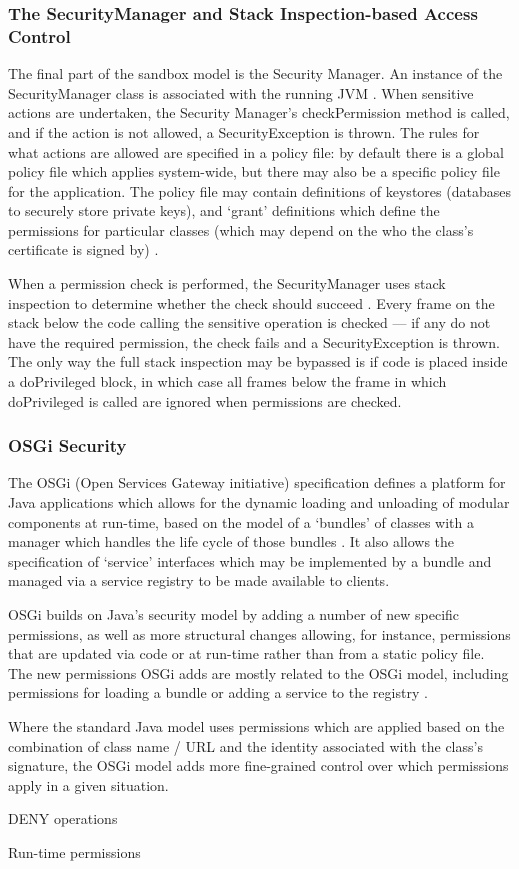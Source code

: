 \subsubsection{The SecurityManager and Stack Inspection-based Access Control}

The final part of the sandbox model is the Security Manager. An instance of the SecurityManager class is associated with the running JVM \cite{gosling2014java}. When sensitive actions are undertaken, the Security Manager's checkPermission method is called, and if the action is not allowed, a SecurityException is thrown. The rules for what actions are allowed are specified in a policy file: by default there is a global policy file which applies system-wide, but there may also be a specific policy file for the application. The policy file may contain definitions of keystores (databases to securely store private keys), and `grant' definitions which define the permissions for particular classes (which may depend on the who the class's certificate is signed by) \cite{gosling2014java}.

When a permission check is performed, the SecurityManager uses stack inspection to determine whether the check should succeed \cite{gong2003javasecurity}. Every frame on the stack below the code calling the sensitive operation is checked --- if any do not have the required permission, the check fails and a SecurityException is thrown. The only way the full stack inspection may be bypassed is if code is placed inside a doPrivileged block, in which case \cite{gong2003javasecurity} all frames below the frame in which doPrivileged is called are ignored when permissions are checked.


\subsubsection{OSGi Security}

The OSGi (Open Services Gateway initiative) specification defines a platform for Java applications which allows for the dynamic loading and unloading of modular components at run-time, based on the model of a `bundles' of classes with a manager which handles the life cycle of those bundles \cite{osgi2014osgi}. It also allows the specification of `service' interfaces which may be implemented by a bundle and managed via a service registry to be made available to clients.

OSGi builds on Java's security model by adding a number of new specific permissions, as well as more structural changes allowing, for instance, permissions that are updated via code or at run-time rather than from a static policy file. The new permissions OSGi adds are mostly related to the OSGi model, including permissions for loading a bundle or adding a service to the registry \cite{hall2011osgi}.

Where the standard Java model uses permissions which are applied based on the combination of class name / URL and the identity associated with the class's signature, the OSGi model adds more fine-grained control over which permissions apply in a given situation.

DENY operations

Run-time permissions

\cite{philippov2012security}